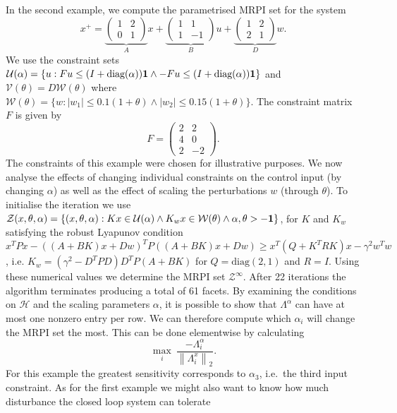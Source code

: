 \documentclass[letterpaper, 10pt, conference]{ieeeconf} %
\providecommand{\norm}[1]{\left\|#1\right\|}
\providecommand{\abs}[1]{\left|#1\right|}
\begin{document}
In the second example, we compute the parametrised MRPI set for the system
%
$$
x^+ = \underbrace{\left(\begin{array}{cc}1 & 2 \\ 0 & 1\end{array}\right)}_Ax + 
\underbrace{\left(\begin{array}{cc} 1 & 1 \\ 1 & -1\end{array}\right)}_B u + 
\underbrace{\left(\begin{array}{cc} 1 & 2 \\ 2 & 1 \end{array}\right)}_D w.
$$
%
We use the constraint sets $\mathcal U(\alpha) = \{u: Fu\leq(I+\text{diag}(\alpha)){\bf{1}} \wedge
-Fu\leq (I+\text{diag}(\alpha)){\bf{1}}\}$ and $\mathcal V(\theta) = D\mathcal W(\theta)$ where $\mathcal W(\theta) = \{w:
\abs{w_1}\leq 0.1(1+\theta)\wedge \abs{w_2}\leq 0.15(1+\theta)\}$. The constraint matrix $F$ is given by
%
$$
	F = \left(\begin{array}{cc} 2 & 2 \\ 4 & 0 \\ 2 & -2 \end{array}\right).
$$
%
The constraints of this example were chosen for  illustrative purposes.
We now analyse the effects of changing individual constraints on the control input (by changing $\alpha$) as well as the
effect of scaling the perturbations $w$ (through $\theta$). To initialise the iteration we use
$\mathcal Z(x,\theta,\alpha) = \left\{(x,\theta,\alpha): Kx\in\mathcal U(\alpha)\wedge K_w x\in\mathcal W
(\theta)\wedge \alpha,\theta>-{\bf{1}}\right\}$, for $K$ and $K_w$ satisfying the robust Lyapunov condition
$x^TPx - ((A+BK)x+Dw)^TP((A+BK)x+Dw)\geq x^T(Q+K^TRK)x -\gamma^2 w^Tw$, i.e. $K_w = (\gamma^2-D^TPD)D^TP(A+BK)$
for $Q = \text{diag}(2,1)$ and $R = I$. Using these numerical values we determine the MRPI set 
$\mathcal Z^\infty$. After 22 iterations the algorithm terminates producing a total of 61 facets. 
By examining the conditions on $\mathcal H$ and the scaling parameters $\alpha$, it is possible to show that 
$\Lambda^\alpha$ can have at 
most one nonzero entry per row. We can therefore 
compute which $\alpha_i$ will change the MRPI set the most. This can be done elementwise by calculating
%
$$
	\max_i \  \frac{-\Lambda_i^\alpha}{\norm{\Lambda_i^x}_2}.
$$
%
For this example the greatest sensitivity corresponds to $\alpha_3$, 
i.e.~the third input constraint.
As for the first example we might also want to know how much disturbance the closed loop system can tolerate 
\end{document}
